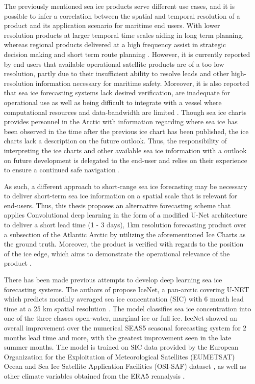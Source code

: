 \documentclass[../main/thesis.tex]{subfiles}
\begin{document}
The previously mentioned sea ice products serve different use cases, and it is possible to infer a correlation between the spatial and temporal resolution of a product and its application scenario for maritime end users. With lower resolution products at larger temporal time scales aiding in long term planning, whereas regional products delivered at a high frequency assist in strategic decision making and short term route planning \cite{Wagner2020}. However, it is currently reported by end users that available operational satellite products are of a too low resolution, partly due to their insufficient ability to resolve leads and other high-resolution information necessary for maritime safety. Moreover, it is also reported that sea ice forecasting systems lack desired verification, are inadequate for operational use as well as being difficult to integrate with a vessel where computational resources and data-bandwidth are limited \cite{Veland2021}. Though sea ice charts provides personnel in the Arctic with information regarding where sea ice has been observed in the time after the previous ice chart has been published, the ice charts lack a description on the future outlook. Thus, the responsibility of interpreting the ice charts and other available sea ice information with a outlook on future development is delegated to the end-user and relies on their experience to ensure a continued safe navigation \cite{Veland2021}.

As such, a different approach to short-range sea ice forecasting may be necessary to deliver short-term sea ice information on a spatial scale that is relevant for end-users. Thus, this thesis proposes an alternative forecasting scheme that applies Convolutional deep learning in the form of a modified U-Net architecture \cite{Ronneberger2015} to deliver a short lead time (1 - 3 days), 1km resolution forecasting product over a subsection of the Atlantic Arctic by utilizing the aforementioned Ice Charts as the ground truth. Moreover, the product is verified with regards to the position of the ice edge, which aims to demonstrate the operational relevance of the product \cite{Veland2021, Melsom2019}. 

There has been made previous attempts to develop deep learning sea ice forecasting systems. The authors of \cite{Andersson2021} propose IceNet, a pan-arctic covering U-NET which predicts monthly averaged sea ice concentration (SIC) with 6 month lead time at a 25 km spatial resolution \cite{Andersson2021}. The model classifies sea ice concentration into one of the three classes open-water, marginal ice or full ice. IceNet showed an overall improvement over the numerical SEAS5 seasonal forecasting system \cite{Johnson2019} for 2 months lead time and more, with the greatest improvement seen in the late summer months. The model is trained on SIC data provided by the European Organization for the Exploitation of Meteorological Satellites (EUMETSAT) Ocean and Sea Ice Satellite Application Facilities (OSI-SAF) dataset \cite{Lavergne2019}, as well as other climate variables obtained from the ERA5 reanalysis \cite{Hersbach2020}.
\end{document}
